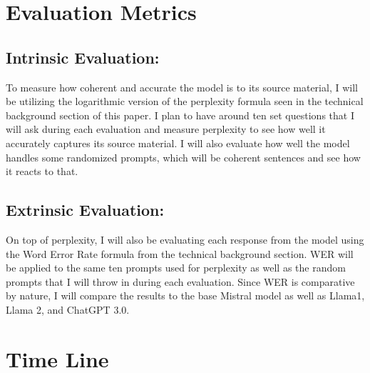 \documentclass[10pt,twocolumn]{article}
\begin{document}
\section{Evaluation Metrics}

\subsection{Intrinsic Evaluation: }
To measure how coherent and accurate the model is to its source material, I will be utilizing the logarithmic version of the perplexity formula seen in the technical background section of this paper. I plan to have around ten set questions that I will ask during each evaluation and measure perplexity to see how well it accurately captures its source material. I will also evaluate how well the model handles some randomized prompts, which will be coherent sentences and see how it reacts to that. 

\subsection{Extrinsic Evaluation:}
On top of perplexity, I will also be evaluating each response from the model using the Word Error Rate formula from the technical background section. WER will be applied to the same ten prompts used for perplexity as well as the random prompts that I will throw in during each evaluation. Since WER is comparative by nature, I will compare the results to the base Mistral model as well as Llama1, Llama 2, and ChatGPT 3.0.


\section{Time Line}
\end{document}
